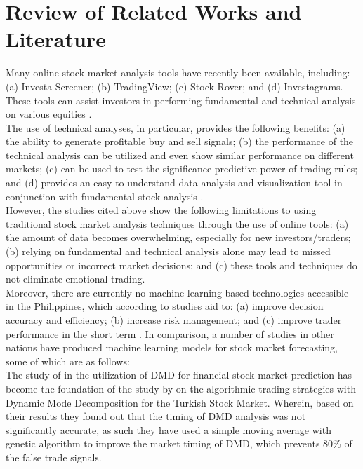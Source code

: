\chapter{Review of Related Works and Literature}
\label{chap:lit_review}
Many online stock market analysis tools have recently been available, including: 
(a) Investa Screener; (b) TradingView; (c) Stock Rover; and (d) Investagrams. 
These tools can assist investors in performing fundamental and technical analysis on 
various equities
\cite{Benignos2020, Carey2023, DayTradingz, Investagrams}.
\\

The use of technical analyses, in particular, provides the following 
benefits: (a) the ability to generate profitable buy and sell signals; (b) the performance 
of the technical analysis can be utilized and even show similar performance on different 
markets; (c) can be used to test the significance predictive power of trading rules; and 
(d) provides an easy-to-understand data analysis and visualization tool in conjunction 
with fundamental stock analysis
\cite{Abbad2014AdvantagesOU, Priatmojo2022TechnicalAT, Ausloos_2002, Tangsripairoj2020StockifyAW}.
\\

However, the studies cited above show the following limitations to using 
traditional stock market analysis techniques through the use of online tools: 
(a) the amount of data becomes overwhelming, especially for new investors/traders; 
(b) relying on fundamental and technical analysis alone may lead to missed 
opportunities or incorrect market decisions; and (c) these tools and techniques 
do not eliminate emotional trading.
\\

Moreover, there are currently no machine learning-based technologies accessible in the 
Philippines, which according to studies aid to: (a) improve decision accuracy and efficiency; 
(b) increase risk management; and (c) improve trader performance in the short term
\cite{Lu2022MachineLI, Shaheen2020UseOM, Singh_2022, Prasad2021ImportanceOM, 
Zhang2022ApplicationOB, Obthong2020}. In comparison, a number of studies in other nations have 
produced machine learning models for stock market forecasting, some of which are as follows:
\\

The study of  in the utilization of DMD for financial stock market 
prediction has become the foundation of the study by  
on the algorithmic trading strategies with Dynamic Mode Decomposition 
for the Turkish Stock Market. Wherein, based on their results they found out 
that the timing of DMD analysis was not significantly accurate, as such they 
have used a simple moving average with genetic algorithm to improve the market 
timing of DMD, which prevents 80\% of the false trade signals.
\\

